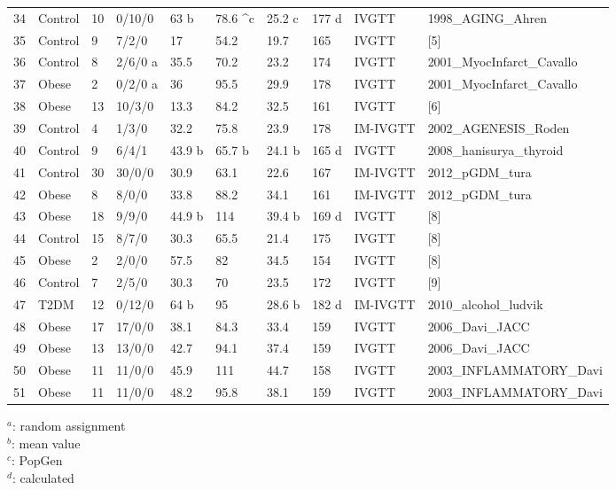 \documentclass[utf8]{frontiersSCNS} %
\begin{document}
\begin{table}[h]
{\begin{tabular}{llllllllll}
34 & Control & 10 & 0/10/0  & 63 b   & 78.6 ^c & 25.2 c & 177 d & IVGTT    & 1998_AGING_Ahren         \\
35 & Control & 9  & 7/2/0   & 17     & 54.2    & 19.7   & 165   & IVGTT    & [5]                      \\
36 & Control & 8  & 2/6/0 a & 35.5   & 70.2    & 23.2   & 174   & IVGTT    & 2001_MyocInfarct_Cavallo \\
37 & Obese   & 2  & 0/2/0 a & 36     & 95.5    & 29.9   & 178   & IVGTT    & 2001_MyocInfarct_Cavallo \\
38 & Obese   & 13 & 10/3/0  & 13.3   & 84.2    & 32.5   & 161   & IVGTT    & [6]                      \\
39 & Control & 4  & 1/3/0   & 32.2   & 75.8    & 23.9   & 178   & IM-IVGTT & 2002_AGENESIS_Roden      \\
40 &
  Control &
  9 &
  6/4/1 &
  43.9 b &
  65.7 b &
  24.1 b &
  165 d &
  IVGTT &
  2008_hanisurya_thyroid \\
41 & Control & 30 & 30/0/0  & 30.9   & 63.1    & 22.6   & 167   & IM-IVGTT & 2012_pGDM_tura           \\
42 & Obese   & 8  & 8/0/0   & 33.8   & 88.2    & 34.1   & 161   & IM-IVGTT & 2012_pGDM_tura           \\
43 & Obese   & 18 & 9/9/0   & 44.9 b & 114     & 39.4 b & 169 d & IVGTT    & [8]                      \\
44 & Control & 15 & 8/7/0   & 30.3   & 65.5    & 21.4   & 175   & IVGTT    & [8]                      \\
45 & Obese   & 2  & 2/0/0   & 57.5   & 82      & 34.5   & 154   & IVGTT    & [8]                      \\
46 & Control & 7  & 2/5/0   & 30.3   & 70      & 23.5   & 172   & IVGTT    & [9]                      \\
47 & T2DM    & 12 & 0/12/0  & 64 b   & 95      & 28.6 b & 182 d & IM-IVGTT & 2010_alcohol_ludvik      \\
48 & Obese   & 17 & 17/0/0  & 38.1   & 84.3    & 33.4   & 159   & IVGTT    & 2006_Davi_JACC           \\
49 & Obese   & 13 & 13/0/0  & 42.7   & 94.1    & 37.4   & 159   & IVGTT    & 2006_Davi_JACC           \\
50 & Obese   & 11 & 11/0/0  & 45.9   & 111     & 44.7   & 158   & IVGTT    & 2003_INFLAMMATORY_Davi   \\
51 & Obese   & 11 & 11/0/0  & 48.2   & 95.8    & 38.1   & 159   & IVGTT    & 2003_INFLAMMATORY_Davi  \\ \hline
\end{tabular}}
\end{table}
$^a$: random assignment \\
$^b$: mean value \\
$^c$: PopGen \\
$^d$: calculated \\
\end{document}
